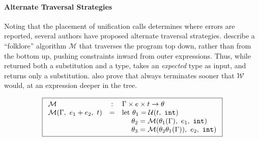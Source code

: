 \paragraph{Alternate Traversal Strategies}
Noting that the placement of unification calls determines where errors
are reported, several authors have proposed alternate traversal
strategies.
%
\citet{Lee1998-ys} describe a ``folklore'' algorithm $\mathcal{M}$ that
traverses the program top down, rather than from the bottom up, pushing
constraints inward from outer expressions.
%
Thus, while \W returned both a substitution and a type, \M takes an
\emph{expected} type as input, and returns only a substitution.
%
\citeauthor{Lee1998-ys} also prove that \M always terminates sooner that
$\mathcal{W}$ would, \ie at an expression deeper in the tree.
%
\begin{figure}
\centering
\[
\boxed{
\begin{array}{lcl}
\mathcal{M} & : & \Gamma \times e \times t \rightarrow \theta \\
\mathcal{M}(\Gamma,\ e_1 + e_2,\ t)
   & = & \text{let } \theta_1 = \mathcal{U}(t,\ \mathtt{int}) \\
   &   & \quad\ \theta_2 = \mathcal{M}(\theta_1(\Gamma),\ e_1,\ \mathtt{int}) \\
   &   & \quad\ \theta_3 = \mathcal{M}(\theta_2\theta_1(\Gamma)),\ e_2,\ \mathtt{int}) \\

\end{array}}\]
\end{figure}
